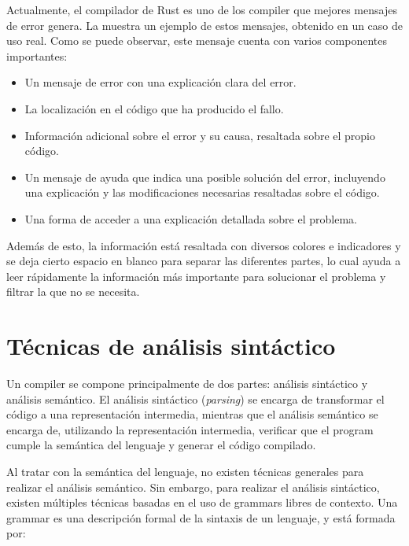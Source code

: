 
Actualmente, el compilador de Rust \parencite{Rust} es uno de los
compiler que mejores mensajes de error genera. La 
muestra un ejemplo de estos mensajes, obtenido en un caso de uso real. Como se
puede observar, este mensaje cuenta con varios componentes importantes:

\begin{itemize}
    \item Un mensaje de error con una explicación clara del error.
    \item La localización en el código que ha producido el fallo.
    \item Información adicional sobre el error y su causa, resaltada sobre el
    propio código.
    \item Un mensaje de ayuda que indica una posible solución del error,
    incluyendo una explicación y las modificaciones necesarias resaltadas sobre
    el código.
    \item Una forma de acceder a una explicación detallada sobre el problema.
\end{itemize}

Además de esto, la información está resaltada con diversos colores e indicadores
y se deja cierto espacio en blanco para separar las diferentes partes, lo cual
ayuda a leer rápidamente la información más importante para solucionar el
problema y filtrar la que no se necesita.


\FloatBarrier

\section{Técnicas de análisis sintáctico}\label{sec:parser-techniques}

Un \gls{compiler} se compone principalmente de dos partes: análisis sintáctico y
análisis semántico. El análisis sintáctico (\textit{parsing}) se encarga de
transformar el código a una representación intermedia, mientras que el análisis
semántico se encarga de, utilizando la representación intermedia, verificar que
el \gls{program} cumple la semántica del lenguaje y generar el código compilado.
\parencite{dragon-book}

Al tratar con la semántica del lenguaje, no existen técnicas generales para
realizar el análisis semántico. Sin embargo, para realizar el análisis
sintáctico, existen múltiples técnicas basadas en el uso de \glspl{grammar}
libres de contexto. Una \gls{grammar} es una descripción formal de la sintaxis
de un lenguaje, y está formada por: \parencite{dragon-book}

